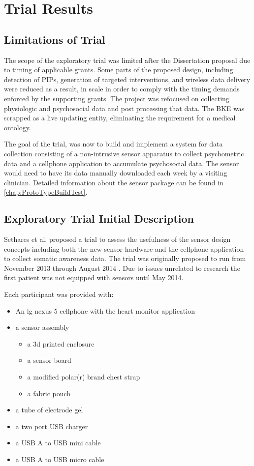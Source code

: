\chapter{Trial Results} 

\section {Limitations of Trial}
The scope of the exploratory trial was limited after the Dissertation proposal due to timing of applicable grants. Some parts of the proposed design, including detection of PIPs, generation of targeted interventions, and wireless data delivery were reduced as a result, in scale in order to comply with the timing demands enforced by the supporting grants. The project was refocused on collecting physiologic and psychosocial data and post processing that data. The BKE was scrapped as a live updating entity, eliminating the requirement for a medical ontology.

The goal of the trial, was now to build and implement a system for data collection consisting of a non-intrusive sensor apparatus to collect psychometric data and a cellphone application to accumulate psychosocial data. The sensor would need to have its data manually downloaded each week by a visiting clinician. Detailed information about the sensor package can be found in \cref{chap:ProtoTypeBuildTest}.


\section{Exploratory Trial Initial Description}

Sethares et al. proposed a trial to assess the usefulness of the sensor design concepts including both the new sensor hardware and the cellphone application to collect somatic awareness data.  The trial was originally proposed to run from November 2013 through August 2014 \cite{KristenASethares2013}. Due to issues unrelated to research the first patient was not equipped with sensors until May 2014.

Each participant was provided with:
\begin{itemize}
\item An lg nexus 5 cellphone with the heart monitor application
\item a sensor assembly
	\begin{itemize}
	\item a 3d printed enclosure
	\item a sensor board
	\item a modified polar(r) brand chest strap
	\item a fabric pouch
	\end{itemize}
\item a tube of electrode gel
\item a two port USB charger
\item a USB A to USB mini cable
\item a USB A to USB micro cable
\end{itemize}

